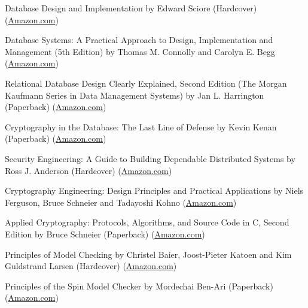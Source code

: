 \documentclass[10pt]{article}
\newenvironment{innerlist}[1][\enskip\textbullet]%
      {\begin{flushleft}\begin{compactitem}[#1]}{\end{compactitem}\end{flushleft}}
\begin{document}
\begin{innerlist}
                \item Database Design and Implementation
                  by Edward Sciore (Hardcover)
                  (\href{http://www.amazon.com/Database-Design-Implementation-Edward-Sciore/dp/0471757160}{Amazon.com})
                \item Database Systems: A Practical Approach to Design, Implementation and Management (5th Edition)
                  by Thomas M. Connolly and Carolyn E. Begg
                  (\href{http://www.amazon.com/Database-Systems-Practical-Implementation-Management/dp/0321523067}{Amazon.com})
                \item Relational Database Design Clearly Explained, Second Edition (The Morgan Kaufmann Series in Data Management Systems)
                  by Jan L. Harrington (Paperback)
                  (\href{http://www.amazon.com/Relational-Database-Explained-Kaufmann-Management/dp/1558608206}{Amazon.com})

                \item Cryptography in the Database: The Last Line of Defense
                  by Kevin Kenan (Paperback)
                  (\href{http://www.amazon.com/Cryptography-Database-Last-Line-Defense/dp/0321320735}{Amazon.com})
                \item Security Engineering: A Guide to Building Dependable Distributed Systems
                  by Ross J. Anderson (Hardcover)
                  (\href{http://www.amazon.com/Security-Engineering-Building-Dependable-Distributed/dp/0470068523}{Amazon.com})
                \item Cryptography Engineering: Design Principles and Practical Applications
                  by Niels Ferguson, Bruce Schneier and Tadayoshi Kohno
                  (\href{http://www.amazon.com/Cryptography-Engineering-Principles-Practical-Applications/dp/0470474246}{Amazon.com})
                \item Applied Cryptography: Protocols, Algorithms, and Source Code in C, Second Edition
                  by Bruce Schneier (Paperback)
                  (\href{http://www.amazon.com/Applied-Cryptography-Protocols-Algorithms-Source/dp/0471117099}{Amazon.com})

                \item Principles of Model Checking
                  by Christel Baier, Joost-Pieter Katoen and Kim Guldstrand Larsen (Hardcover)
                  (\href{http://www.amazon.com/Principles-Model-Checking-Christel-Baier/dp/026202649X}{Amazon.com})
                \item Principles of the Spin Model Checker
                  by Mordechai Ben-Ari (Paperback)
                  (\href{http://www.amazon.com/Principles-Model-Checker-Mordechai-Ben-Ari/dp/1846287693}{Amazon.com})


\end{innerlist}
\end{document}
